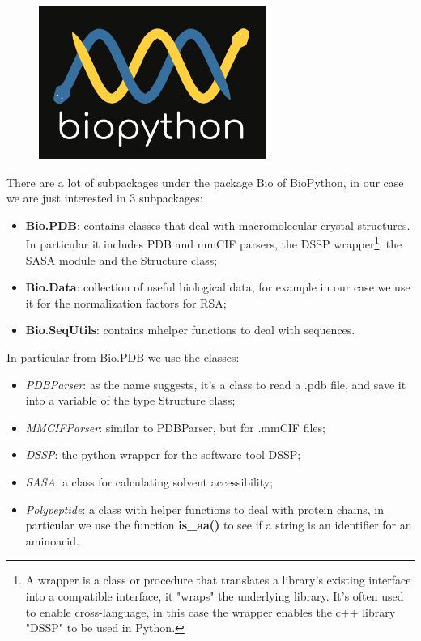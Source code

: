 \begin{figure}[h!]
    \centering
    \includegraphics{res/proteins_overview/biopython.png}
\end{figure}

There are a lot of subpackages under the package Bio of BioPython, in our case we are just interested in 3 subpackages:
\begin{itemize}
    \item \textbf{Bio.PDB}: contains classes that deal with macromolecular crystal structures. In particular it includes PDB and mmCIF parsers, the DSSP wrapper\footnote{A wrapper is a class or procedure that translates a library's existing interface into a compatible interface, it "wraps" the underlying library. It's often used to enable cross-language, in this case the wrapper enables the c++ library "DSSP" to be used in Python.}, the SASA module and the Structure class;
    \item \textbf{Bio.Data}: collection of useful biological data, for example in our case we use it for the normalization factors for RSA;
    \item \textbf{Bio.SeqUtils}: contains mhelper functions to deal with sequences.
\end{itemize}

In particular from Bio.PDB we use the classes:
\begin{itemize}
    \item \textit{PDBParser}: as the name suggests, it's a class to read a .pdb file, and save it into a variable of the type Structure class;
    \item \textit{MMCIFParser}: similar to PDBParser, but for .mmCIF files;
    \item \textit{DSSP}: the python wrapper for the software tool DSSP;
    \item \textit{SASA}: a class for calculating solvent accessibility;
    \item \textit{Polypeptide}: a class with helper functions to deal with protein chains, in particular we use the function \textbf{is\_aa()} to see if a string is an identifier for an aminoacid.
\end{itemize}


